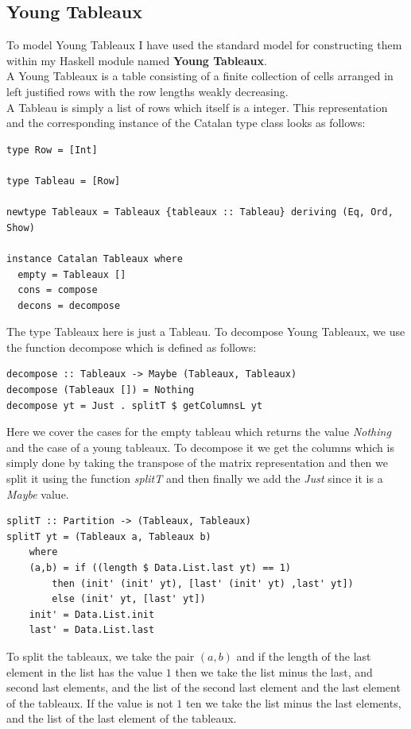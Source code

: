 \documentclass[12pt]{article}
\begin{document}
\subsection{Young Tableaux}
To model Young Tableaux I have used the standard model for constructing them within my Haskell module named {\bf Young Tableaux}.\\
A Young Tableaux is a table consisting of a finite collection of cells arranged in left justified rows with the row lengths weakly decreasing.\\
A Tableau is simply a list of rows which itself is a integer. This representation and the corresponding instance of the Catalan type class looks as follows:
\begin{lstlisting}
type Row = [Int]

type Tableau = [Row]

newtype Tableaux = Tableaux {tableaux :: Tableau} deriving (Eq, Ord, Show)

instance Catalan Tableaux where
  empty = Tableaux []
  cons = compose
  decons = decompose
\end{lstlisting}
The type Tableaux here is just a Tableau. To decompose Young Tableaux, we use the function decompose which is defined as follows:
\begin{lstlisting}
decompose :: Tableaux -> Maybe (Tableaux, Tableaux)
decompose (Tableaux []) = Nothing
decompose yt = Just . splitT $ getColumnsL yt
\end{lstlisting}
Here we cover the cases for the empty tableau which returns the value {\it Nothing} and the case of a young tableaux. To decompose it we get the columns which is simply done by taking the transpose of the matrix representation and then we split it using the function {\it splitT} and then finally we add the {\it Just} since it is a {\it Maybe} value.
\begin{lstlisting}
splitT :: Partition -> (Tableaux, Tableaux)
splitT yt = (Tableaux a, Tableaux b)
	where
	(a,b) = if ((length $ Data.List.last yt) == 1)
		then (init' (init' yt), [last' (init' yt) ,last' yt])
		else (init' yt, [last' yt])	
	init' = Data.List.init
	last' = Data.List.last
\end{lstlisting}
To split the tableaux, we take the pair $(a, b)$ and if the length of the last element in the list has the value $1$ then we take the list minus the last, and second last elements, and the list of the second last element and the last element of the tableaux. If the value is not $1$ ten we take the list minus the last elements, and the list of the last element of the tableaux.
\end{document}
